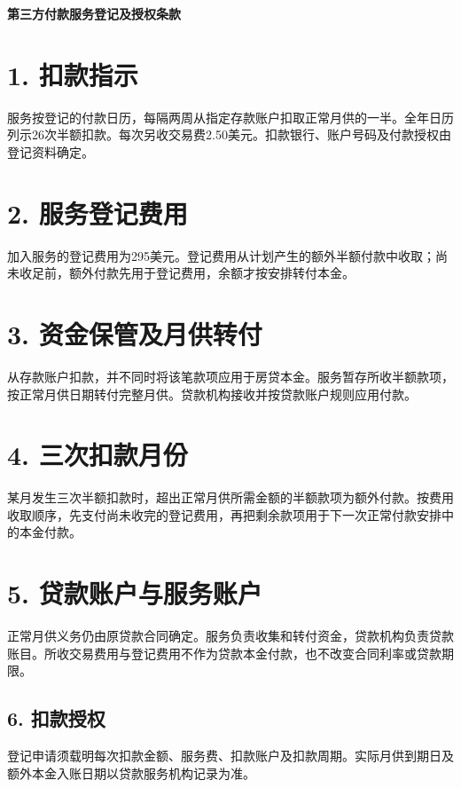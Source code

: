 \documentclass[UTF8,fontset=none,11pt,a4paper]{ctexart}
\begin{document}
{\noindent\fontsize{20}{25}\selectfont\bfseries 第三方付款服务登记及授权条款\par}
\vspace{10pt}
\section*{1. 扣款指示}
服务按登记的付款日历，每隔两周从指定存款账户扣取正常月供的一半。全年日历列示26次半额扣款。每次另收交易费2.50美元。扣款银行、账户号码及付款授权由登记资料确定。


\section*{2. 服务登记费用}
加入服务的登记费用为295美元。登记费用从计划产生的额外半额付款中收取；尚未收足前，额外付款先用于登记费用，余额才按安排转付本金。


\section*{3. 资金保管及月供转付}
从存款账户扣款，并不同时将该笔款项应用于房贷本金。服务暂存所收半额款项，按正常月供日期转付完整月供。贷款机构接收并按贷款账户规则应用付款。


\section*{4. 三次扣款月份}
某月发生三次半额扣款时，超出正常月供所需金额的半额款项为额外付款。按费用收取顺序，先支付尚未收完的登记费用，再把剩余款项用于下一次正常付款安排中的本金付款。


\section*{5. 贷款账户与服务账户}
正常月供义务仍由原贷款合同确定。服务负责收集和转付资金，贷款机构负责贷款账目。所收交易费用与登记费用不作为贷款本金付款，也不改变合同利率或贷款期限。


\subsection*{6. 扣款授权}
登记申请须载明每次扣款金额、服务费、扣款账户及扣款周期。实际月供到期日及额外本金入账日期以贷款服务机构记录为准。
\end{document}
